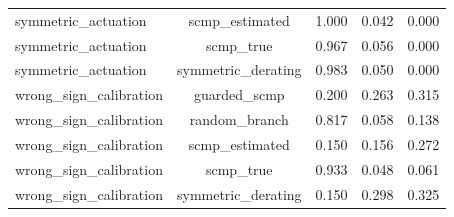 \begin{table}[t]
\begin{tabular}{lcccc}
symmetric\_actuation & scmp\_estimated & 1.000 & 0.042 & 0.000 \\
symmetric\_actuation & scmp\_true & 0.967 & 0.056 & 0.000 \\
symmetric\_actuation & symmetric\_derating & 0.983 & 0.050 & 0.000 \\
wrong\_sign\_calibration & guarded\_scmp & 0.200 & 0.263 & 0.315 \\
wrong\_sign\_calibration & random\_branch & 0.817 & 0.058 & 0.138 \\
wrong\_sign\_calibration & scmp\_estimated & 0.150 & 0.156 & 0.272 \\
wrong\_sign\_calibration & scmp\_true & 0.933 & 0.048 & 0.061 \\
wrong\_sign\_calibration & symmetric\_derating & 0.150 & 0.298 & 0.325 \\
\bottomrule
\end{tabular}
\end{table}
